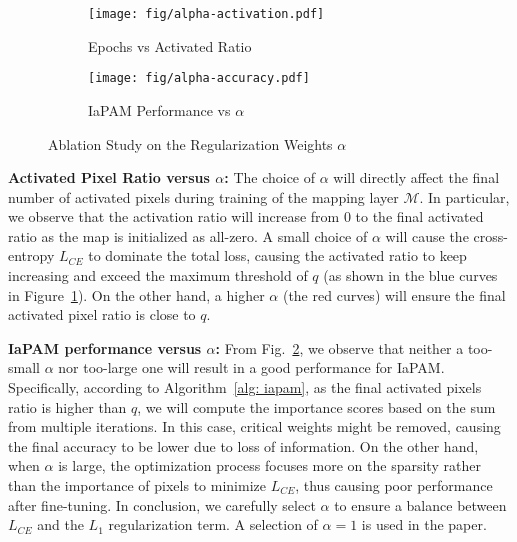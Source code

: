 \begin{figure}[t]
    \centering
    \begin{subfigure}[b]{0.49\linewidth}
    \centering
        \texttt{[image: fig/alpha-activation.pdf]}
        \caption{Epochs vs Activated Ratio}
        \label{fig:alpha-sub1}
    \end{subfigure}
    \hfill 
    \begin{subfigure}[b]{0.49\linewidth}
        \centering
        \texttt{[image: fig/alpha-accuracy.pdf]}
        \caption{IaPAM Performance vs $\alpha$}
        \label{fig:alpha-sub2}
    \end{subfigure}
    \caption{Ablation Study on the Regularization Weights $\alpha$}
    \label{fig: ablation study on alpha}
\end{figure}
\noindent\textbf{Activated Pixel Ratio versus $\alpha$:}
The choice of $\alpha$ will directly affect the final number of activated pixels during training of the mapping layer $\mathcal{M}$.
In particular, we observe that the activation ratio will increase from $0$ to the final activated ratio as the map is initialized as all-zero.
A small choice of $\alpha$ will cause the cross-entropy $L_{CE}$ to dominate the total loss, causing the activated ratio to keep increasing and exceed the maximum threshold of $q$ (as shown in the {\color{bleudefrance!60} blue} curves in Figure~\ref{fig:alpha-sub1}).
On the other hand, a higher $\alpha$ (the {\color{red!60} red} curves) will ensure the final activated pixel ratio is close to $q$.


\noindent\textbf{IaPAM performance versus $\alpha$:}
From Fig.~\ref{fig:alpha-sub2}, we observe that neither a too-small $\alpha$ nor too-large one will result in a good performance for IaPAM.
Specifically, according to Algorithm~\ref{alg: iapam}, as the final activated pixels ratio is higher than $q$, we will compute the importance scores based on the sum from multiple iterations.
In this case, critical weights might be removed, causing the final accuracy to be lower due to loss of information.
On the other hand, when $\alpha$ is large, the optimization process focuses more on the sparsity rather than the importance of pixels to minimize $L_{CE}$, thus causing poor performance after fine-tuning.
In conclusion, we carefully select $\alpha$ to ensure a balance between $L_{CE}$ and the $L_1$ regularization term.
A selection of $\alpha=1$ is used in the paper.

